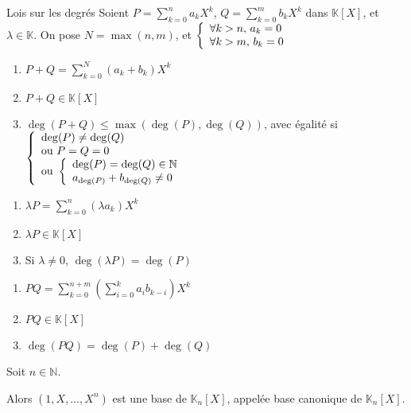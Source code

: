     \begin{theo}{Lois sur les degrés}{}
        Soient $P = \sum\limits_{k =0}^n a_k X^k$, $Q=\sum\limits_{k =0}^m b_k X^k$ dans $\mathbb{K}[X]$, et $\lambda \in \mathbb{K}$. \newline
        On pose $N = \max(n,m)$, et $\et{\forall k > n, \, a_k = 0}{\forall k > m, \, b_k = 0}$
    
        \begin{alors}
            \item \begin{enumerate}[label=\alph*.]
                \item $P + Q = \sum\limits_{k =0}^N (a_k + b_k) X^k$
                \item $P + Q \in \mathbb{K}[X]$
                \item $\deg(P+Q) \leq \max(\deg(P),\deg(Q))$, avec égalité si $ \left\{ \begin{array}{l}
                    \deg(P) \neq \deg(Q) \\
                    \text{ou } P = Q = 0 \\
                    \text{ou } \et{\deg(P)=\deg(Q) \in \mathbb{N}}{a_{\deg(P)} + b_{\deg(Q)} \neq 0}
                \end{array} \right. $
            \end{enumerate}
            \item \begin{enumerate}[label=\alph*.]
                \item $\lambda P = \sum\limits_{k =0}^n (\lambda a_k) X^k$
                \item $\lambda P \in \mathbb{K}[X]$
                \item Si $\lambda \neq 0$, $\deg(\lambda P) = \deg(P)$
            \end{enumerate}
            \item \begin{enumerate}[label=\alph*.]
                \item $PQ = \sum\limits_{k=0}^{n+m} \left( \sum\limits_{i = 0}^k a_i b_{k-i} \right) X^k$
                \item $PQ \in \mathbb{K}[X]$
                \item $\deg(PQ) = \deg(P) + \deg(Q)$
            \end{enumerate}
        \end{alors}
    \end{theo}
    
    \begin{theo}{}{}
        Soit $n \in \mathbb{N}$.
    
        Alors $(1, X, \ldots, X^n)$ est une base de $\mathbb{K}_n[X]$, appelée base canonique de $\mathbb{K}_n[X]$.
    \end{theo}
    

